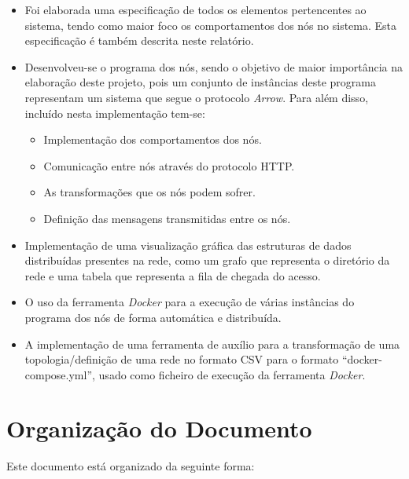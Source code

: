 \begin{itemize}
    \item Foi elaborada uma especificação de todos os elementos pertencentes ao sistema, tendo como maior foco os comportamentos dos nós no sistema. Esta especificação é também descrita neste relatório. 
    \item Desenvolveu-se o programa dos nós, sendo o objetivo de maior importância na elaboração deste projeto, pois um conjunto de instâncias deste programa representam um sistema que segue o protocolo \emph{Arrow}. Para além disso, incluído nesta implementação tem-se:

    \begin{itemize}
	\item Implementação dos comportamentos dos nós.
	\item Comunicação entre nós através do protocolo \acs{HTTP}.
	\item As transformações que os nós podem sofrer.
	\item Definição das mensagens transmitidas entre os nós.
    \end{itemize}

    \item Implementação de uma visualização gráfica das estruturas de dados distribuídas presentes na rede, como um grafo que representa o diretório da rede e uma tabela que representa a fila de chegada do acesso.
    \item O uso da ferramenta \emph{Docker} para a execução de várias instâncias do programa dos nós de forma automática e distribuída.
    \item A implementação de uma ferramenta de auxílio para a transformação de uma topologia/definição de uma rede no formato \acs{CSV} para o formato ``docker-compose.yml'', usado como ficheiro de execução da ferramenta \emph{Docker}.

\end{itemize}




\section{Organização do Documento}
\label{introducao:sec:organizacao}
Este documento está organizado da seguinte forma:

